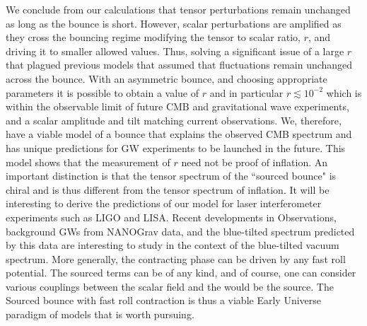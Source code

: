 \documentclass[12pt,a4paper]{article}
\numberwithin{equation}{section}
\numberwithin{equation}{section}
\begin{document}
We conclude from our calculations that tensor perturbations
remain unchanged as long as the bounce is short. However, scalar perturbations are amplified as they cross the bouncing regime modifying the tensor to scalar ratio, $r$, and driving it to smaller allowed values. Thus, solving a significant issue of a large $r$ that plagued previous models that assumed that fluctuations remain unchanged across the bounce. With an asymmetric bounce, and choosing appropriate parameters it is possible to obtain a value of $r$ and in particular $r \lesssim 10^{-2}$ which is within the observable limit of future CMB and gravitational wave experiments, and a scalar amplitude and tilt matching current observations. %
We, therefore, have a viable model of a bounce that explains the observed CMB spectrum and has unique predictions for GW experiments to be launched in the future. This model shows that the measurement of $r$ need not be proof of inflation. An important distinction is that the tensor spectrum of the ``sourced bounce" is chiral and is thus different from the tensor spectrum of inflation. It will be interesting to derive the predictions of our model for laser interferometer experiments such as LIGO and LISA.%
Recent developments in Observations, background GWs from NANOGrav data, and the blue-tilted spectrum predicted by this data are interesting to study in the context of the blue-tilted vacuum spectrum\cite{Ben-Dayan:2023lwd,Vagnozzi:2023lwo}. 
More generally, the contracting phase can be driven by any fast roll potential. The sourced terms can be of any kind, and of course, one can consider various couplings between the scalar field and the would be the source. The Sourced bounce with fast roll contraction is thus a viable Early Universe paradigm of models that is worth pursuing. %
\appendix
\end{document}
